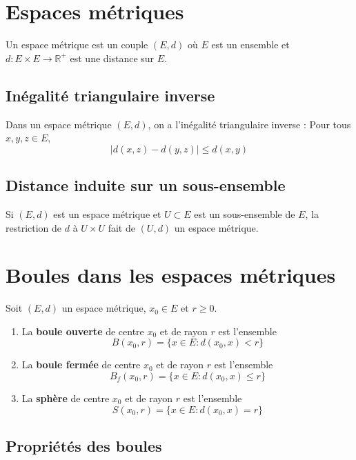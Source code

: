 \section{Espaces métriques}

\begin{definition}
Un espace métrique est un couple $(E, d)$ où $E$ est un ensemble et $d : E \times E \to \mathbb{R}^+$ est une distance sur $E$.
\end{definition}

\subsection{Inégalité triangulaire inverse}
Dans un espace métrique $(E, d)$, on a l'inégalité triangulaire inverse :
Pour tous $x, y, z \in E$,
\[
|d(x, z) - d(y, z)| \leq d(x, y)
\]

\subsection{Distance induite sur un sous-ensemble}
Si $(E, d)$ est un espace métrique et $U \subset E$ est un sous-ensemble de $E$, la restriction de $d$ à $U \times U$ fait de $(U, d)$ un espace métrique.

\section{Boules dans les espaces métriques}

Soit $(E, d)$ un espace métrique, $x_0 \in E$ et $r \geq 0$.

\begin{definition}
\begin{enumerate}
    \item La \textbf{boule ouverte} de centre $x_0$ et de rayon $r$ est l'ensemble
    \[
    B(x_0, r) = \{x \in E : d(x_0, x) < r\}
    \]
    \item La \textbf{boule fermée} de centre $x_0$ et de rayon $r$ est l'ensemble
    \[
    B_f(x_0, r) = \{x \in E : d(x_0, x) \leq r\}
    \]
    \item La \textbf{sphère} de centre $x_0$ et de rayon $r$ est l'ensemble
    \[
    S(x_0, r) = \{x \in E : d(x_0, x) = r\}
    \]
\end{enumerate}
\end{definition}

\subsection{Propriétés des boules}

